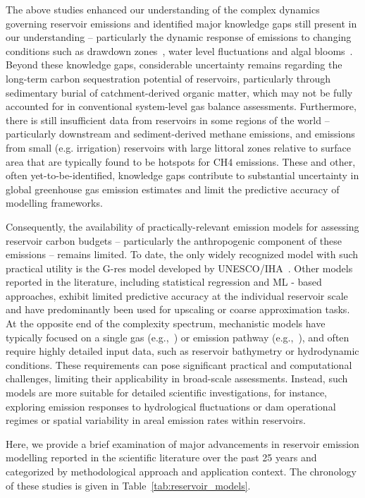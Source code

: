 \documentclass[final,1p,times]{elsarticle}
\begin{document}
The above studies enhanced our understanding of the complex dynamics governing reservoir emissions and identified  
major knowledge gaps still present in our understanding -- particularly the dynamic response of emissions to changing conditions such as drawdown zones~\cite{Barbosa2024}, water level fluctuations and algal blooms~\cite{Liao2024-ct}.
Beyond these knowledge gaps, considerable uncertainty remains regarding the long-term carbon sequestration potential of reservoirs, particularly through sedimentary burial of catchment-derived organic matter, which may not be fully accounted for in conventional system-level gas balance assessments.
Furthermore, there is still insufficient data from reservoirs in some regions of the world -- particularly downstream and sediment-derived methane emissions, and emissions from small (e.g. irrigation) reservoirs with large littoral zones relative to surface area that are typically found to be hotspots for \ac{CH4} emissions.
These and other, often yet-to-be-identified, knowledge gaps contribute to substantial uncertainty in global greenhouse gas emission estimates and limit the predictive accuracy of modelling frameworks.

Consequently, the availability of practically-relevant emission models for assessing reservoir carbon budgets -- particularly the anthropogenic component of these emissions -- remains limited. 
To date, the only widely recognized model with such practical utility is the G-res model developed by UNESCO/IHA~\cite{Prairie2017b, Prairie2021}. 
Other models reported in the literature, including statistical regression and \ac{ML} - based approaches, exhibit limited predictive accuracy at the individual reservoir scale~\cite{Hansen2022} and have predominantly been used for upscaling or coarse approximation tasks. 
At the opposite end of the complexity spectrum, mechanistic models have typically focused on a single gas (e.g.,~\cite{Wu2022, Lomov2024}) or emission pathway (e.g.,~\cite{Berger2014}), and often require highly detailed input data, such as reservoir bathymetry or hydrodynamic conditions. 
These requirements can pose significant practical and computational challenges, limiting their applicability in broad-scale assessments. Instead, such models are more suitable for detailed scientific investigations, for instance, exploring emission responses to hydrological fluctuations or dam operational regimes or spatial variability in areal emission rates within reservoirs.

Here, we provide a brief examination of major advancements in reservoir emission modelling reported in the scientific literature over the past 25 years and categorized by methodological approach and application context. 
The chronology of these studies is given in Table~\ref{tab:reservoir_models}.
\end{document}
